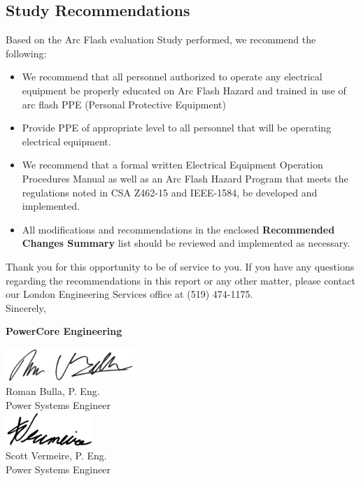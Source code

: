 \subsection{Study Recommendations}
\label{af:results:afsr}

Based on the Arc Flash evaluation Study performed, we recommend the following:
\begin{itemize}
\item We recommend that all personnel authorized to operate any electrical equipment be properly educated on Arc Flash Hazard and trained  in use of arc flash PPE (Personal Protective Equipment)

\item	Provide PPE of appropriate level to all personnel that will be operating electrical equipment.

\item	We recommend that a formal written Electrical Equipment Operation Procedures Manual as well as an Arc Flash Hazard Program that meets the regulations noted in CSA Z462-15 and IEEE-1584, be developed and implemented.

\item All modifications and recommendations in the enclosed \textbf{Recommended Changes Summary} list should be reviewed and implemented as necessary.

\end{itemize}
\vspace{10mm}
\noindent Thank you for this opportunity to be of service to you.  If you have any questions regarding the recommendations in this report or any other matter, please contact our London Engineering Services office at (519) 474-1175. \newline
\vspace{5mm}
\\
\noindent Sincerely,\newline

\vspace{5mm}
\noindent\textbf{PowerCore Engineering}\newline

\begin{multicols}{2}
\centering
\includegraphics[height=0.5in, keepaspectratio=true]{../Images/Roman_signature.jpg} \\
Roman Bulla, P. Eng. \\Power Systems Engineer \\
\includegraphics[height=0.5in, keepaspectratio=true]{../Images/Scott_signature.jpg} \\
Scott Vermeire, P. Eng. \\Power Systems Engineer \\
\end{multicols}

